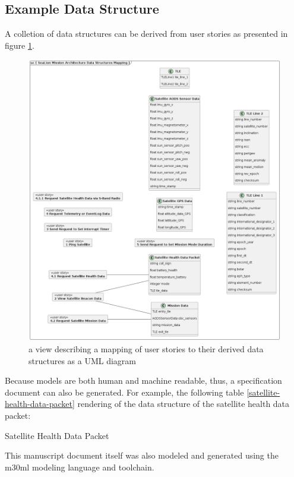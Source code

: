 \documentclass[conf]{new-aiaa}
\begin{document}
\subsection{Example Data Structure}

A colletion of data structures can be derived from user stories as presented in figure \ref{data-structures-mapping}.

\begin{figure}[hbt!]
    \centering
    \includegraphics[width=.8\textwidth]{data-structures-mapping}
    \caption{a view describing a mapping of user stories to their derived data structures as a UML diagram}
    \label{data-structures-mapping}
\end{figure}

Because models are both human and machine readable, thus, a specification document can also be generated. For example, the following table \ref{satellite-health-data-packet} rendering of the data structure of the satellite health data packet:

\begin{table}
    \centering
    
    \caption{Satellite Health Data Packet}
    \label{satellite-health-data-packet}
\end{table}

This manuscript document itself was also modeled and generated using the m30ml modeling language and toolchain.
\end{document}
